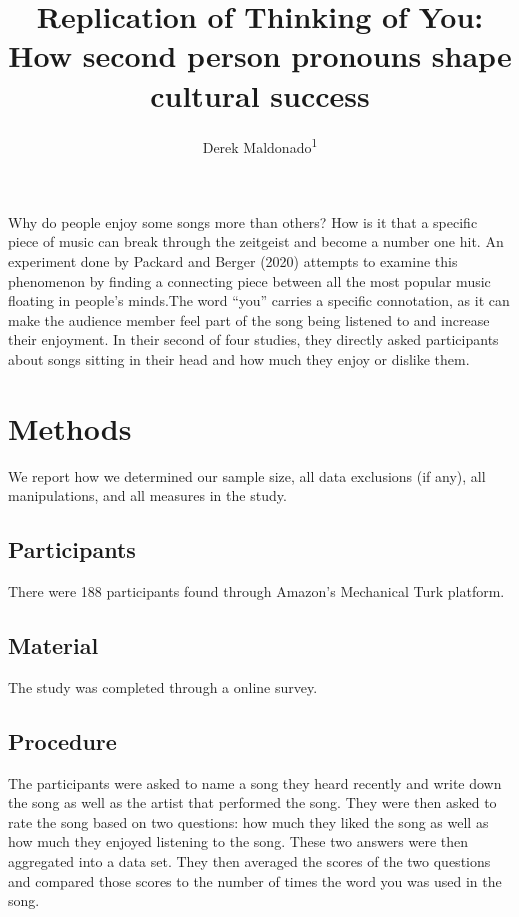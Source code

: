 \documentclass[
  english,
  man]{apa6}
\title{Replication of Thinking of You: How second person pronouns shape cultural success}
\author{Derek Maldonado\textsuperscript{1}}
\date{}
\affiliation{\vspace{0.5cm}\textsuperscript{1} Brooklyn College}
\begin{document}
\maketitle

Why do people enjoy some songs more than others? How is it that a specific piece of music can break through the zeitgeist and become a number one hit. An experiment done by Packard and Berger (2020) attempts to examine this phenomenon by finding a connecting piece between all the most popular music floating in people's minds.The word ``you'' carries a specific connotation, as it can make the audience member feel part of the song being listened to and increase their enjoyment. In their second of four studies, they directly asked participants about songs sitting in their head and how much they enjoy or dislike them.

\hypertarget{methods}{%
\section{Methods}\label{methods}}

We report how we determined our sample size, all data exclusions (if any), all manipulations, and all measures in the study.

\hypertarget{participants}{%
\subsection{Participants}\label{participants}}

There were 188 participants found through Amazon's Mechanical Turk platform.

\hypertarget{material}{%
\subsection{Material}\label{material}}

The study was completed through a online survey.

\hypertarget{procedure}{%
\subsection{Procedure}\label{procedure}}

The participants were asked to name a song they heard recently and write down the song as well as the artist that performed the song. They were then asked to rate the song based on two questions: how much they liked the song as well as how much they enjoyed listening to the song. These two answers were then aggregated into a data set.
They then averaged the scores of the two questions and compared those scores to the number of times the word you was used in the song.
\end{document}
